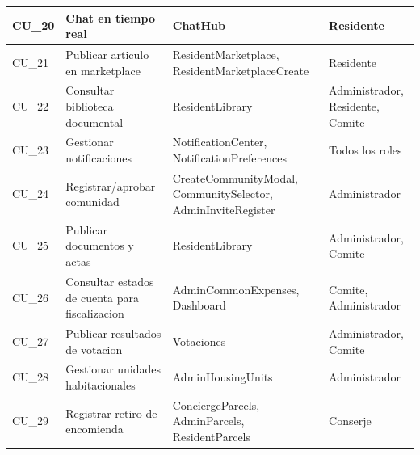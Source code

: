 \begin{longtable}{|p{}|p{}|p{}|p{}|}
\hline
CU\_20 & Chat en tiempo real & ChatHub & Residente \\
\hline
CU\_21 & Publicar articulo en marketplace & ResidentMarketplace, ResidentMarketplaceCreate & Residente \\
\hline
CU\_22 & Consultar biblioteca documental & ResidentLibrary & Administrador, Residente, Comite \\
\hline
CU\_23 & Gestionar notificaciones & NotificationCenter, NotificationPreferences & Todos los roles \\
\hline
CU\_24 & Registrar/aprobar comunidad & CreateCommunityModal, CommunitySelector, AdminInviteRegister & Administrador \\
\hline
CU\_25 & Publicar documentos y actas & ResidentLibrary & Administrador, Comite \\
\hline
CU\_26 & Consultar estados de cuenta para fiscalizacion & AdminCommonExpenses, Dashboard & Comite, Administrador \\
\hline
CU\_27 & Publicar resultados de votacion & Votaciones & Administrador, Comite \\
\hline
CU\_28 & Gestionar unidades habitacionales & AdminHousingUnits & Administrador \\
\hline
CU\_29 & Registrar retiro de encomienda & ConciergeParcels, AdminParcels, ResidentParcels & Conserje \\

\end{longtable}

\endgroup
